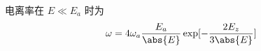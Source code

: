 
电离率在 $E \ll E_a$ 时为
\begin{equation}
\omega = 4\omega_a \frac{E_a}{\abs{E}} \exp[-\frac{2E_z}{3\abs{E}}]
\end{equation}
